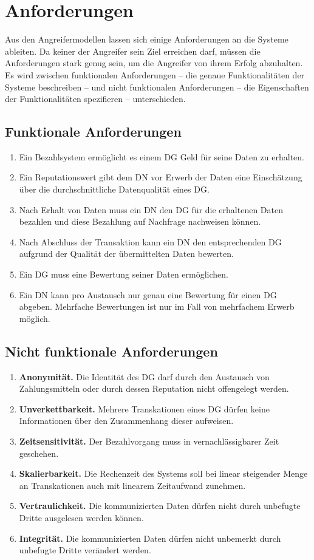 \documentclass[
	fontsize=11pt,
	headings=small,
	parskip=half,           %
	bibliography=totoc,
	numbers=noenddot,       %
	open=any,               %
]{scrreprt}
\begin{document}
\section{Anforderungen}
Aus den Angreifermodellen lassen sich einige Anforderungen an die Systeme ableiten. Da keiner der Angreifer sein Ziel erreichen darf, müssen die Anforderungen stark genug sein, um die Angreifer von ihrem Erfolg abzuhalten. Es wird zwischen funktionalen Anforderungen -- die genaue Funktionalitäten der Systeme beschreiben -- und nicht funktionalen Anforderungen -- die Eigenschaften der Funktionalitäten spezifieren -- unterschieden.
\subsection{Funktionale Anforderungen}
\label{enum:req:funktional}
\begin{enumerate}
    \item Ein Bezahlsystem ermöglicht es einem DG Geld für seine Daten zu erhalten.
    \item Ein Reputationswert gibt dem DN vor Erwerb der Daten eine Einschätzung über die durchschnittliche Datenqualität eines DG.
    \item Nach Erhalt von Daten muss ein DN den DG für die erhaltenen Daten bezahlen und diese Bezahlung auf Nachfrage nachweisen können.
    \item Nach Abschluss der Transaktion kann ein DN den entsprechenden DG aufgrund der Qualität der übermittelten Daten bewerten.
    \item Ein DG muss eine Bewertung seiner Daten ermöglichen.
    \item Ein DN kann pro Austausch nur genau eine Bewertung für einen DG abgeben. Mehrfache Bewertungen ist nur im Fall von mehrfachem Erwerb möglich.
\end{enumerate}

\subsection{Nicht funktionale Anforderungen}
\label{enum:req:nichtfunktional}
\begin{enumerate}
    \item \textbf{Anonymität.} Die Identität des DG darf durch den Austausch von Zahlungsmitteln oder durch dessen Reputation nicht offengelegt werden.
    \item \textbf{Unverkettbarkeit.} Mehrere Transkationen eines DG dürfen keine Informationen über den Zusammenhang dieser aufweisen. 
    \item \textbf{Zeitsensitivität.} Der Bezahlvorgang muss in vernachlässigbarer Zeit geschehen.
    \item \textbf{Skalierbarkeit.} Die Rechenzeit des Systems soll bei linear steigender Menge an Transkationen auch mit linearem Zeitaufwand zunehmen.
    \item \textbf{Vertraulichkeit.} Die kommunizierten Daten dürfen nicht durch unbefugte Dritte ausgelesen werden können.
    \item \textbf{Integrität.} Die kommunizierten Daten dürfen nicht unbemerkt durch unbefugte Dritte verändert werden.
\end{enumerate}
\end{document}
